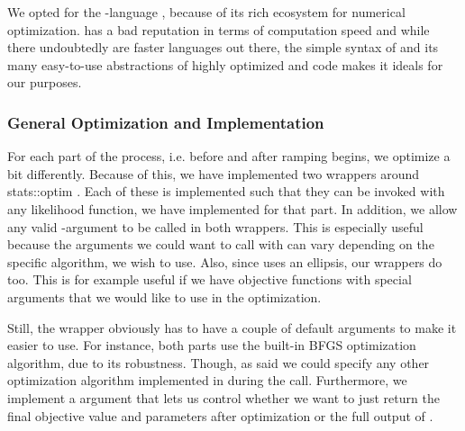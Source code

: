We opted for the -language \cite{Rlang}, because of its rich ecosystem for numerical optimization.  has a bad reputation in terms of computation speed and while there undoubtedly are faster languages out there, the simple syntax of  and its many easy-to-use abstractions of highly optimized  and  code makes it ideals for our purposes.
\subsubsection{General Optimization and Implementation}
For each part of the process, i.e. before and after ramping begins, we optimize a bit differently. Because of this, we have implemented two wrappers around {stats::optim} \cite{Rlang}. Each of these is implemented such that they can be invoked with any likelihood function, we have implemented for that part. In addition, we allow any valid -argument to be called in both wrappers. This is especially useful because the arguments we could want to call  with can vary depending on the specific algorithm, we wish to use. Also, since  uses an ellipsis, our wrappers do too. This is for example useful if we have objective functions with special arguments that we would like to use in the optimization.

Still, the wrapper obviously has to have a couple of default arguments to make it easier to use. For instance, both parts use the built-in BFGS optimization algorithm, due to its robustness. Though, as said we could specify any other optimization algorithm implemented in  during the call. Furthermore, we implement a  argument that lets us control whether we want to just return the final objective value and parameters after optimization or the full output of .

